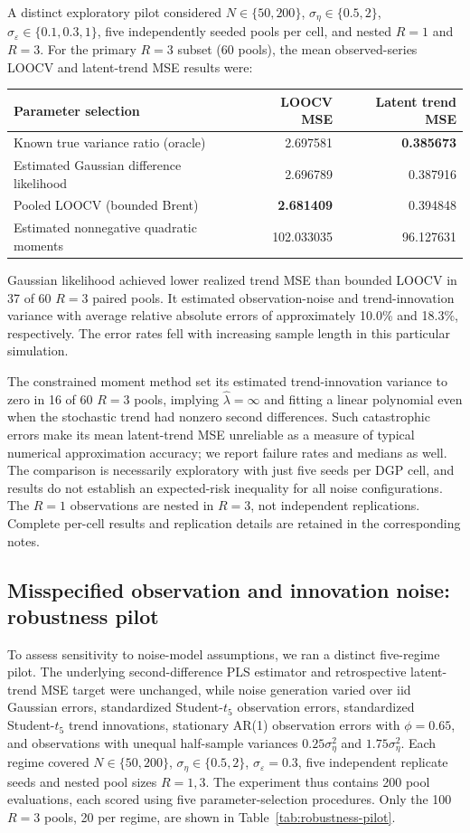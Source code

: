 \documentclass[11pt]{article}
\begin{document}
A distinct exploratory pilot considered $N\in\{50,200\}$,
$\sigma_\eta\in\{0.5,2\}$,
$\sigma_\varepsilon\in\{0.1,0.3,1\}$,
five independently seeded pools per cell, and nested $R=1$ and $R=3$.
For the primary $R=3$ subset (60 pools), the mean
observed-series LOOCV and latent-trend MSE results were:
\begin{center}
\begin{tabular}{lrr}
\toprule
Parameter selection & LOOCV MSE & Latent trend MSE\\
\midrule
Known true variance ratio (oracle) & 2.697581 & \textbf{0.385673}\\
Estimated Gaussian difference likelihood & 2.696789 & 0.387916\\
Pooled LOOCV (bounded Brent) & \textbf{2.681409} & 0.394848\\
Estimated nonnegative quadratic moments & 102.033035 & 96.127631\\
\bottomrule
\end{tabular}
\end{center}
Gaussian likelihood achieved lower realized trend MSE than bounded
LOOCV in 37 of 60 $R=3$ paired pools. It estimated observation-noise
and trend-innovation variance with average relative absolute errors
of approximately 10.0\% and 18.3\%, respectively. The error rates
fell with increasing sample length in this particular simulation.

The constrained moment method set its estimated trend-innovation
variance to zero in 16 of 60 $R=3$ pools, implying
$\widehat\lambda=\infty$ and fitting a linear polynomial even
when the stochastic trend had nonzero second differences. Such
catastrophic errors make its mean latent-trend MSE unreliable as a
measure of typical numerical approximation accuracy; we report
failure rates and medians as well. The comparison is necessarily
exploratory with just five seeds per DGP cell, and results
do not establish an expected-risk inequality for all noise
configurations. The $R=1$ observations are nested in $R=3$,
not independent replications. Complete per-cell results and
replication details are retained in the corresponding notes.

\subsection{Misspecified observation and innovation noise: robustness pilot}

To assess sensitivity to noise-model assumptions, we ran a distinct
five-regime pilot. The underlying second-difference PLS estimator
and retrospective latent-trend MSE target were unchanged, while
noise generation varied over iid Gaussian errors, standardized
Student-$t_5$ observation errors, standardized Student-$t_5$
trend innovations, stationary AR(1) observation errors with
$\phi=0.65$, and observations with unequal half-sample variances
$0.25\sigma_\eta^2$ and $1.75\sigma_\eta^2$.
Each regime covered $N\in\{50,200\}$, $\sigma_\eta\in\{0.5,2\}$,
$\sigma_\varepsilon=0.3$, five independent replicate seeds and
nested pool sizes $R=1,3$. The experiment thus contains
200 pool evaluations, each scored using five parameter-selection
procedures. Only the 100 $R=3$ pools, 20 per regime, are shown
in Table~\ref{tab:robustness-pilot}.
\end{document}
